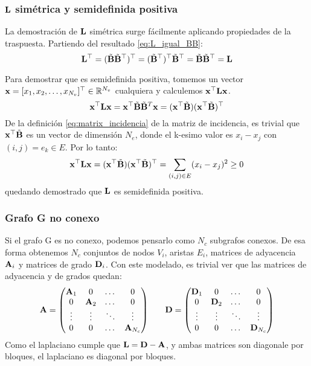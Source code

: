 \documentclass{article}
\begin{document}
\subsubsection{$\mathbf{L}$ simétrica y semidefinida positiva}

La demostración de $\mathbf{L}$ simétrica surge fácilmente aplicando propiedades de la traspuesta. Partiendo del resultado \eqref{eq:L_igual_BB}:
\begin{equation}
    \mathbf{L}^\top = (\tilde{\mathbf{B}}\tilde{\mathbf{B}}^\top)^\top = (\tilde{\mathbf{B}}^\top)^\top \tilde{\mathbf{B}}^\top = \tilde{\mathbf{B}}\tilde{\mathbf{B}}^\top = \mathbf{L}
\end{equation}

Para demostrar que es semidefinida positiva, tomemos un vector $\mathbf{x} = [x_1, x_2, \dots, x_{N_v}]^\top \in \mathbb{R}^{N_v}$
cualquiera y calculemos $\mathbf{x}^\top\mathbf{L}\mathbf{x}$.
\begin{equation*}
    \mathbf{x}^\top\mathbf{L}\mathbf{x} = \mathbf{x}^\top \tilde{\mathbf{B}}\tilde{\mathbf{B}}^T\mathbf{x} = (\mathbf{x}^\top\tilde{\mathbf{B}})(\mathbf{x}^\top\tilde{\mathbf{B}})^\top
\end{equation*}
De la definición \eqref{eq:matrix_incidencia} de la matriz de incidencia, es trivial que $\mathbf{x}^\top \tilde{\mathbf{B}}$ es un vector de dimensión $N_e$, donde el k-esimo valor es $x_i-x_j$ con $(i,j) = e_k \in E$.  Por lo tanto:
\begin{equation}
    \mathbf{x}^\top\mathbf{L}\mathbf{x} = (\mathbf{x}^\top\tilde{\mathbf{B}})(\mathbf{x}^\top\tilde{\mathbf{B}})^\top = \sum_{(i,j)\in E} (x_i-x_j)^2 \geq 0
\end{equation}
quedando demostrado que $\mathbf{L}$ es semidefinida positiva.

\subsubsection{Grafo G no conexo}

Si el grafo G es no conexo, podemos pensarlo como $N_c$ subgrafos conexos. De esa forma
obtenemos $N_c$ conjuntos de nodos $V_i$, aristas $E_i$, matrices de adyacencia $\mathbf{A}_i$ y matrices de grado $\mathbf{D}_i$. Con este modelado, es trivial ver que las matrices de adyacencia y de grados quedan:
\begin{equation*}
    \begin{array}{l c r}
        \mathbf{A} = \left(\begin{matrix}
            \mathbf{A}_1 & 0 & \dots & 0 \\
            0 & \mathbf{A}_2 & \dots & 0 \\
            \vdots & \vdots & \ddots & \vdots \\
            0 & 0 & \dots & \mathbf{A}_{N_c}
        \end{matrix}\right) 
        & &
        \mathbf{D} =\left(\begin{matrix}
             \mathbf{D}_1 & 0 & \dots & 0 \\
            0 & \mathbf{D}_2 & \dots & 0 \\
            \vdots & \vdots & \ddots & \vdots \\
            0 & 0 & \dots & \mathbf{D}_{N_c}
        \end{matrix}\right)
    \end{array}
\end{equation*}
Como el laplaciano cumple que $\mathbf{L} = \mathbf{D} - \mathbf{A}$, y ambas matrices son diagonale por bloques, el laplaciano es diagonal por bloques. 
\end{document}
